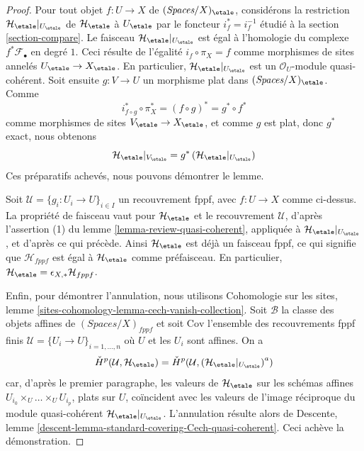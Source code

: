 \begin{proof}
Pour tout objet $f : U \to X$ de $(\textit{Spaces}/X)_\etale$, considérons la
restriction $\mathcal{H}_\etale|_{U_\etale}$ de $\mathcal{H}_\etale$ à
$U_\etale$ par le foncteur $i_f^* = i_f^{-1}$ étudié à la section
\ref{section-compare}. Le faisceau $\mathcal{H}_\etale|_{U_\etale}$ est égal à
l'homologie du complexe $f^*\mathcal{F}_\bullet$ en degré $1$.
Ceci résulte de l'égalité $i_f \circ \pi_X = f$ comme morphismes de sites
annelés $U_\etale \to X_\etale$. En particulier,
$\mathcal{H}_\etale|_{U_\etale}$ est un $\mathcal{O}_U$-module quasi-cohérent.
Soit ensuite $g : V \to U$ un morphisme plat dans
$(\textit{Spaces}/X)_\etale$. Comme
$$
i_{f \circ g}^* \circ \pi_X^* = (f \circ g)^* = g^* \circ f^*
$$
comme morphismes de sites $V_\etale \to X_\etale$, et comme $g$ est plat, donc
$g^*$ exact, nous obtenons
$$
\mathcal{H}_\etale|_{V_\etale} =
g^*\left(\mathcal{H}_\etale|_{U_\etale}\right)
$$
Ces préparatifs achevés, nous pouvons démontrer le lemme.

\medskip\noindent
Soit $\mathcal{U} = \{g_i : U_i \to U\}_{i \in I}$ un recouvrement fppf, avec
$f : U \to X$ comme ci-dessus. La propriété de faisceau vaut pour
$\mathcal{H}_\etale$ et le recouvrement $\mathcal{U}$, d'après l'assertion (1)
du lemme \ref{lemma-review-quasi-coherent}, appliquée à
$\mathcal{H}_\etale|_{U_\etale}$, et d'après ce qui précède.
Ainsi $\mathcal{H}_\etale$ est déjà un faisceau fppf, ce qui signifie que
$\mathcal{H}_{fppf}$ est égal à $\mathcal{H}_\etale$ comme préfaisceau.
En particulier,
$\mathcal{H}_\etale = \epsilon_{X, *}\mathcal{H}_{fppf}$.

\medskip\noindent
Enfin, pour démontrer l'annulation, nous utilisons Cohomologie sur les sites,
lemme \ref{sites-cohomology-lemma-cech-vanish-collection}. Soit $\mathcal{B}$
la classe des objets affines de $(\textit{Spaces}/X)_{fppf}$ et soit
$\text{Cov}$ l'ensemble des recouvrements fppf finis
$\mathcal{U} = \{U_i \to U\}_{i = 1, \ldots, n}$ où $U$ et les $U_i$ sont affines.
On a
$$
{\check H}^p(\mathcal{U}, \mathcal{H}_\etale) =
{\check H}^p(\mathcal{U}, \left(\mathcal{H}_\etale|_{U_\etale}\right)^a)
$$
car, d'après le premier paragraphe, les valeurs de $\mathcal{H}_\etale$ sur les
schémas affines $U_{i_0} \times_U \ldots \times_U U_{i_p}$, plats sur $U$,
coïncident avec les valeurs de l'image réciproque du module quasi-cohérent
$\mathcal{H}_\etale|_{U_\etale}$. L'annulation résulte alors de Descente, lemme
\ref{descent-lemma-standard-covering-Cech-quasi-coherent}.
Ceci achève la démonstration.
\end{proof}

